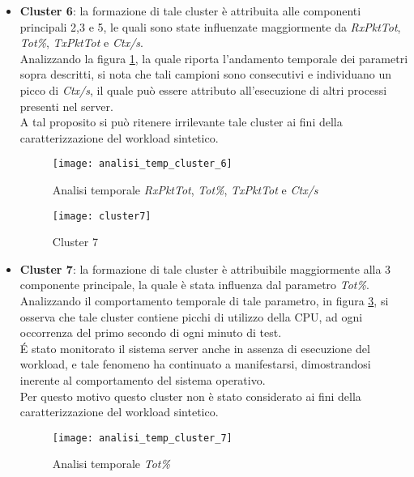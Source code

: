 \begin{itemize}
  \item \textbf{Cluster 6}: la formazione di tale cluster è attribuita alle
  componenti principali 2,3 e 5, le quali sono state influenzate maggiormente
  da \textit{RxPktTot}, \textit{Tot\%}, \textit{TxPktTot} e \textit{Ctx/s}.\\
  Analizzando la figura \ref{analisi_temp_cluster_6}, la quale riporta l'andamento
  temporale dei parametri sopra descritti, si nota che tali campioni sono consecutivi
  e individuano un picco di \textit{Ctx/s}, il quale può essere attributo all'esecuzione
  di altri processi presenti nel server.\\
  A tal proposito si può ritenere irrilevante tale cluster ai fini della
  caratterizzazione del workload sintetico.\\

  \begin{figure}[!htbp]
    \centering
    \texttt{[image: analisi\_temp\_cluster\_6]}
    \caption{Analisi temporale \textit{RxPktTot}, \textit{Tot\%}, \textit{TxPktTot} e \textit{Ctx/s}}
    \label{analisi_temp_cluster_6}
  \end{figure}

  \clearpage

  \begin{figure}[!htbp]
    \centering
    \texttt{[image: cluster7]}
    \caption{Cluster 7}
    \label{cluster7}
  \end{figure}

  \item \textbf{Cluster 7}: la formazione di tale cluster è attribuibile maggiormente
  alla 3 componente principale, la quale è stata influenza dal parametro \textit{Tot\%}.\\
  Analizzando il comportamento temporale di tale parametro, in figura \ref{analisi_temp_cluster_7},
  si osserva che tale cluster contiene picchi di utilizzo della CPU, ad ogni
  occorrenza del primo secondo di ogni minuto di test.\\
  \'E stato monitorato il sistema server anche in assenza di esecuzione del workload,
  e tale fenomeno ha continuato a manifestarsi, dimostrandosi inerente al
  comportamento del sistema operativo.\\
  Per questo motivo questo cluster non è stato considerato ai fini della
  caratterizzazione del workload sintetico.\\

  \begin{figure}[!htbp]
    \centering
    \texttt{[image: analisi\_temp\_cluster\_7]}
    \caption{Analisi temporale \textit{Tot\%}}
    \label{analisi_temp_cluster_7}
  \end{figure}


\end{itemize}
